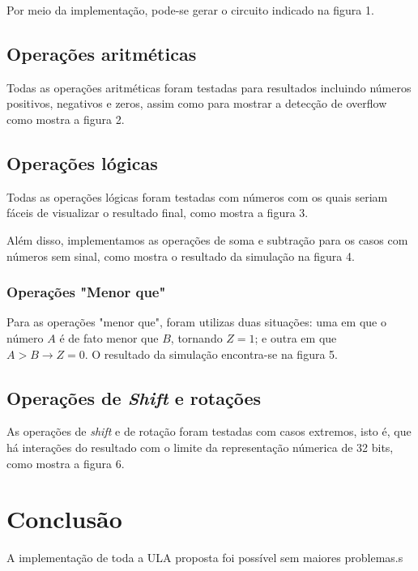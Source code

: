 \documentclass[12pt, a4paper, twoside]{article}
\begin{document}
Por meio da implementação, pode-se gerar o circuito indicado na figura 1.


\subsection{Operações aritméticas}

Todas as operações aritméticas foram testadas para resultados incluindo
números positivos, negativos e zeros, assim como para mostrar a detecção de
overflow como mostra a figura 2.


\subsection{Operações lógicas}

Todas as operações lógicas foram testadas com números com os quais seriam
fáceis de visualizar o resultado final, como mostra a figura 3.


Além disso, implementamos as operações de soma e subtração para os casos
com números sem sinal, como mostra o resultado da simulação na figura 4.


\subsubsection{Operações "Menor que"}

Para as operações "menor que", foram utilizas duas situações: uma em que
o número $A$ é de fato menor que $B$, tornando $Z=1$; e outra em que
$A>B \rightarrow Z=0$. O resultado da simulação encontra-se na figura 5.


\subsection{Operações de \textit{Shift} e rotações}

As operações de \textit{shift} e de rotação foram testadas com casos
extremos, isto é, que há interações do resultado com o limite da representação
númerica de 32 bits, como mostra a figura 6.


\section{Conclusão}

A implementação de toda a ULA proposta foi possível sem maiores problemas.s
\end{document}
